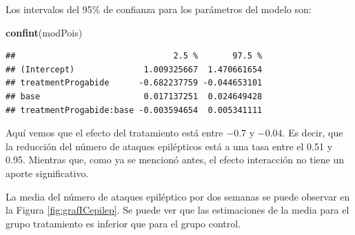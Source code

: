 \documentclass[
]{article}
\newenvironment{Shaded}{\begin{snugshade}}{\end{snugshade}}
\newcommand{\FunctionTok}[1]{\textcolor[rgb]{0.13,0.29,0.53}{\textbf{#1}}}
\newcommand{\NormalTok}[1]{#1}
\begin{document}
Los intervalos del 95\% de confianza para los parámetros del modelo son:

\begin{Shaded}
\begin{Highlighting}[]
\FunctionTok{confint}\NormalTok{(modPois)}
\end{Highlighting}
\end{Shaded}

\begin{verbatim}
##                                2.5 %       97.5 %
## (Intercept)              1.009325667  1.470661654
## treatmentProgabide      -0.682237759 -0.044653101
## base                     0.017137251  0.024649428
## treatmentProgabide:base -0.003594654  0.005341111
\end{verbatim}

Aquí vemos que el efecto del tratamiento está entre \(-0.7\) y \(-0.04\). Es decir, que la reducción del número de ataques epilépticos está a una tasa entre el 0.51 y 0.95. Mientras que, como ya se mencionó antes, el efecto interacción no tiene un aporte significativo.

La media del número de ataques epiléptico por dos semanas se puede observar en la Figura \ref{fig:grafICepilep}. Se puede ver que las estimaciones de la media para el grupo tratamiento es inferior que para el grupo control.
\end{document}
